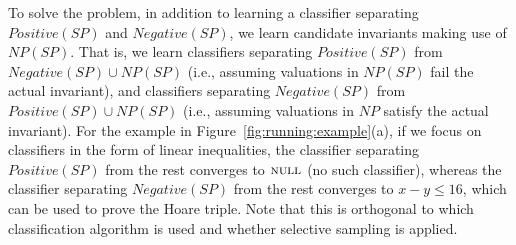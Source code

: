 To solve the problem, in addition to learning a classifier separating $Positive(SP)$ and $Negative(SP)$, we learn candidate invariants making use of $NP(SP)$. That is, we learn classifiers separating $Positive(SP)$ from $Negative(SP) \cup NP(SP)$ (i.e., assuming valuations in $NP(SP)$ fail the actual invariant), and classifiers separating $Negative(SP)$ from $Positive(SP) \cup NP(SP)$ (i.e., assuming valuations in $NP$ satisfy the actual invariant). For the example in Figure~\ref{fig:running:example}(a), if we focus on classifiers in the form of linear inequalities, the classifier separating $Positive(SP)$ from the rest converges to $\textsc{null}$ (no such classifier), whereas the classifier separating $Negative(SP)$ from the rest converges to $x - y \leq 16$, which can be used to prove the Hoare triple. Note that this is orthogonal to which classification algorithm is used and whether selective sampling is applied.

%
